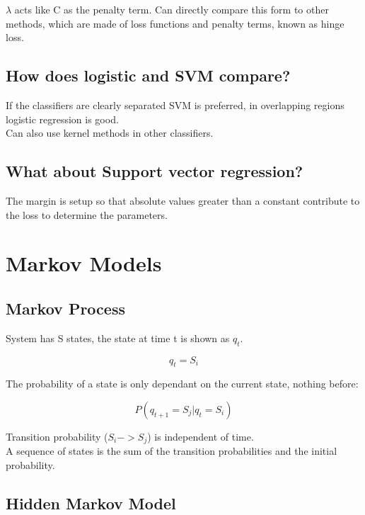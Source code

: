\documentclass[11pt]{scrartcl} %
\begin{document}
\(\lambda\) acts like C as the penalty term. Can directly compare this form to other methods, which are
made of loss functions and penalty terms, known as hinge loss.

\subsection{How does logistic and SVM compare?}

If the classifiers are clearly separated SVM is preferred, in overlapping regions logistic regression is good.\\

Can also use kernel methods in other classifiers.

\subsection{What about Support vector regression?}

The margin is setup so that absolute values greater than a constant contribute to the loss to determine
the parameters.\\

\section{Markov Models}

\subsection{Markov Process}

System has S states, the state at time t is shown as $q_t$.

\begin{equation}
	q_t = S_i
\end{equation}

The probability of a state is only dependant on the current state, nothing before:

\begin{equation}
	P(q_{t+1}=S_j|q_t = S_i)
\end{equation}

Transition probability ($S_i -> S_j$) is independent of time.\\

A sequence of states is the sum of the transition probabilities and the initial probability. 

\subsection{Hidden Markov Model}
\end{document}
